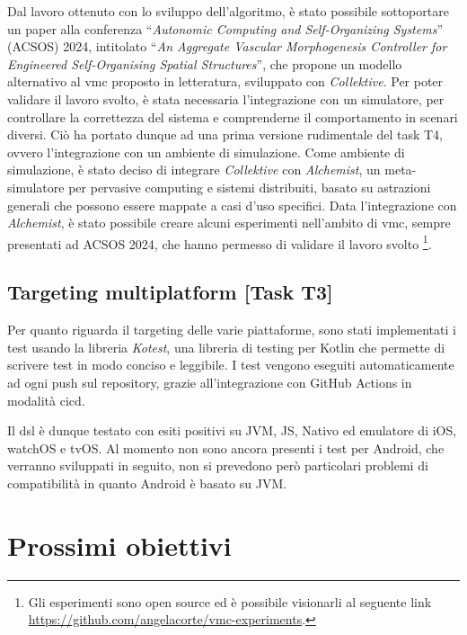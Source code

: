 \documentclass[13pt, a4paper]{article}
\newcommand{\ck}{\emph{Collektive}}
\begin{document}
Dal lavoro ottenuto con lo sviluppo dell'algoritmo,
    è stato possibile sottoportare un paper alla conferenza ``\emph{Autonomic Computing and Self-Organizing Systems}'' (ACSOS) 2024,
    intitolato ``\emph{An Aggregate Vascular Morphogenesis Controller for Engineered Self-Organising Spatial Structures}'',
    che propone un modello alternativo al \ac{vmc} proposto in letteratura,
    sviluppato con \ck{}.
%
Per poter validare il lavoro svolto, è stata necessaria l'integrazione con un simulatore,
    per controllare la correttezza del sistema e comprenderne il comportamento in scenari diversi.
%
Ciò ha portato dunque ad una prima versione rudimentale del task T4, ovvero l'integrazione con un ambiente di simulazione.
%
Come ambiente di simulazione, è stato deciso di integrare \ck{} con \emph{Alchemist},
    un meta-simulatore per pervasive computing e sistemi distribuiti,
    basato su astrazioni generali che possono essere mappate a casi d'uso specifici.
%
Data l'integrazione con \emph{Alchemist}, è stato possibile creare alcuni esperimenti nell'ambito di \ac{vmc},
    sempre presentati ad ACSOS 2024, che hanno permesso di validare il lavoro svolto \footnote{
    Gli esperimenti sono open source ed è possibile visionarli al seguente link \url{https://github.com/angelacorte/vmc-experiments}.
}.

\subsection{Targeting multiplatform [Task T3]}\label{subsec:task-t3-[targeting-multiplatform]}
Per quanto riguarda il targeting delle varie piattaforme,
    sono stati implementati i test usando la libreria \emph{Kotest},
    una libreria di testing per Kotlin che permette di scrivere test in modo conciso e leggibile.
%
I test vengono eseguiti automaticamente ad ogni push sul repository, grazie all'integrazione con GitHub Actions in modalità \ac{cicd}.

Il \ac{dsl} è dunque testato con esiti positivi su JVM, JS, Nativo ed emulatore di iOS, watchOS e tvOS.
%
Al momento non sono ancora presenti i test per Android, che verranno sviluppati in seguito,
    non si prevedono però particolari problemi di compatibilità in quanto Android è basato su JVM.

\section{Prossimi obiettivi}\label{sec:prossimi-obiettivi}






\cite[none]{none}


\end{document}

